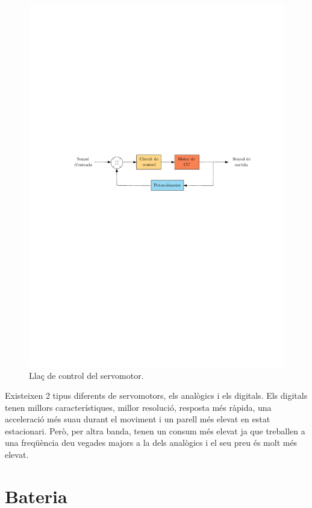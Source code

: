 \begin{figure}[H]
	\centering
	\includegraphics{flux_servo}
	\caption{Llaç de control del servomotor.}
	\label{fig:llacservo}
\end{figure}

Existeixen 2 tipus diferents de servomotors, els analògics i els digitals. Els digitals tenen millors característiques, millor resolució, resposta més ràpida, una acceleració més suau durant el moviment i un parell més elevat en estat estacionari. Però, per altra banda, tenen un consum més elevat ja que treballen a una freqüència deu vegades majors a la dels analògics i el seu preu és molt més elevat. 

\section{Bateria}


